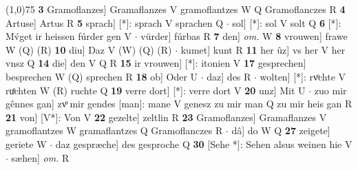 \documentclass[8pt,a4paper,notitlepage]{article}
\begin{document}
\begin{table}[ht]
\begin{minipage}[t]{0.5\linewidth}
\line(1,0){75} \newline
\textbf{3} Gramoflanzes] Gramaflanzes V gramoflantzes W Q Gramoflanczes R \textbf{4} Artuse] Artus R \textbf{5} sprach] [*]: sprach V sprachen Q  $\cdot$ sol] [*]: sol V solt Q \textbf{6} [*]: Mv́get ir heissen fúrder gen V  $\cdot$ vürder] fúrbas R \textbf{7} den] \textit{om.} W \textbf{8} vrouwen] frawe W (Q) (R) \textbf{10} diu] Daz V (W) (Q) (R)  $\cdot$ kumet] kunt R \textbf{11} her ûz] vs her V her vnsz Q \textbf{14} die] den V Q R \textbf{15} ir vrouwen] [*]: itonien V \textbf{17} gesprechen] besprechen W (Q) sprechen R \textbf{18} ob] Oder U  $\cdot$ daz] des R  $\cdot$ wolten] [*]: rvͦchte V ruͦchten W (R) ruchte Q \textbf{19} verre dort] [*]: verre dort V \textbf{20} unz] Mit U  $\cdot$ zuo mir gênnes gan] zvͦ mir gendes [man]: mane V genesz zu mir man Q zu mir heis gan R \textbf{21} von] [V*]: Von V \textbf{22} gezelte] zeltlin R \textbf{23} Gramoflanzes] Gramaflanzes V gramoflantzes W gramaflantzes Q Gramoflanczes R  $\cdot$ dâ] do W Q \textbf{27} zeigete] geriete W  $\cdot$ daz gespræche] des gesproche Q \textbf{30} [Sehe *]: Sehen alsus weinen hie V  $\cdot$ sæhen] \textit{om.} R \newline
\end{minipage}
\end{table}
\end{document}
